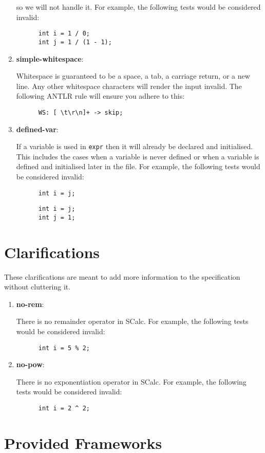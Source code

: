 \documentclass{article}
\newcommand{\code}[1]{\texttt{\textmd{#1}}}
\newcommand{\assertiondest}[1]{\hypertarget{#1}{\textbf{#1}:}}
\newcommand{\clarificationdest}[1]{\hypertarget{#1}{\textbf{#1}:}}
\begin{document}
\begin{enumerate}
    so we will not handle it. For example, the following tests would be considered invalid:
    \begin{lstlisting}
      int i = 1 / 0;
      int j = 1 / (1 - 1);
    \end{lstlisting}
  \item
    \assertiondest{simple-whitespace}
    Whitespace is guaranteed to be a space, a tab, a carriage return, or a new
    line. Any other whitespace characters will render the input invalid. The following ANTLR rule
    will ensure you adhere to this:
    \begin{lstlisting}
      WS: [ \t\r\n]+ -> skip;
    \end{lstlisting}
  \item
    \assertiondest{defined-var}
    If a variable is used in \code{expr} then it will already be declared and initialised. This
    includes the cases when a variable is never defined or when a variable is defined and
    initialised later in the file. For example, the following tests would be considered invalid:
    \begin{lstlisting}
      int i = j;
    \end{lstlisting}
    \begin{lstlisting}
      int i = j;
      int j = 1;
    \end{lstlisting}
\end{enumerate}

\section{Clarifications}
These clarifications are meant to add more information to the specification without cluttering it.
\begin{enumerate}
  \item
    \clarificationdest{no-rem}
    There is no remainder operator in SCalc. For example, the following tests would be considered
    invalid:
    \begin{lstlisting}
      int i = 5 % 2;
    \end{lstlisting}
  \item
    \clarificationdest{no-pow}
    There is no exponentiation operator in SCalc. For example, the following tests would be
    considered invalid:
    \begin{lstlisting}
      int i = 2 ^ 2;
    \end{lstlisting}
\end{enumerate}

\section{Provided Frameworks}
\end{document}
